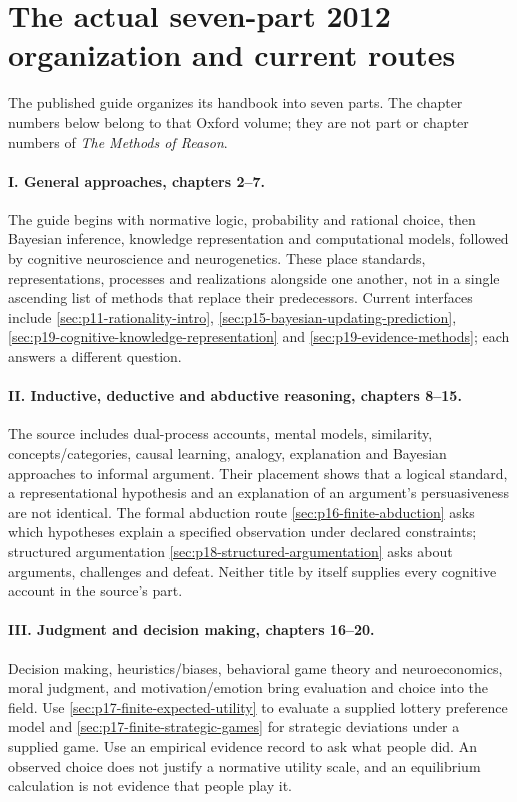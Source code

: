 \section{The actual seven-part 2012 organization and current routes}
\label{sec:p11-ohtr1-organization}

The published guide organizes its handbook into seven parts. The chapter
numbers below belong to that Oxford volume; they are not part or chapter
numbers of \emph{The Methods of Reason}.

\paragraph{I. General approaches, chapters 2--7.}
The guide begins with normative logic, probability and rational choice,
then Bayesian inference, knowledge representation and computational models,
followed by cognitive neuroscience and neurogenetics. These place standards,
representations, processes and realizations alongside one another, not in a
single ascending list of methods that replace their predecessors. Current
interfaces include \cref{sec:p11-rationality-intro},
\cref{sec:p15-bayesian-updating-prediction},
\cref{sec:p19-cognitive-knowledge-representation} and
\cref{sec:p19-evidence-methods}; each answers a different question.

\paragraph{II. Inductive, deductive and abductive reasoning, chapters 8--15.}
The source includes dual-process accounts, mental models, similarity,
concepts/categories, causal learning, analogy, explanation and Bayesian
approaches to informal argument. Their placement shows that a logical
standard, a representational hypothesis and an explanation of an argument's
persuasiveness are not identical. The formal abduction route
\cref{sec:p16-finite-abduction} asks which hypotheses explain a specified
observation under declared constraints; structured argumentation
\cref{sec:p18-structured-argumentation} asks about arguments, challenges
and defeat. Neither title by itself supplies every cognitive account in
the source's part.

\paragraph{III. Judgment and decision making, chapters 16--20.}
Decision making, heuristics/biases, behavioral game theory and neuroeconomics,
moral judgment, and motivation/emotion bring evaluation and choice into the
field. Use \cref{sec:p17-finite-expected-utility} to evaluate a supplied
lottery preference model and \cref{sec:p17-finite-strategic-games} for
strategic deviations under a supplied game. Use an empirical evidence record
to ask what people did. An observed choice does not justify a normative
utility scale, and an equilibrium calculation is not evidence that people
play it.

